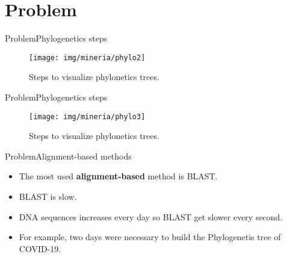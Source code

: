 \documentclass[10pt]{beamer}
\newcommand{\1}{
	\setbeamertemplate{background}{
		\texttt{[image: img/1\_dna]}
		\tikz[overlay] \fill[fill opacity=0.75,fill=white] (0,0) rectangle (-\paperwidth,\paperheight);
	}
}
\begin{document}
\section{Problem}

\begin{frame}{Problem}{Phylogenetics steps}
	\begin{figure}[]
		\centering
		\texttt{[image: img/mineria/phylo2]}
		\label{img:mot2}
		\caption{Steps to visualize phylonetics trees.}
	\end{figure}
\end{frame}

\begin{frame}{Problem}{Phylogenetics steps}
	\begin{figure}[]
		\centering
		\texttt{[image: img/mineria/phylo3]}
		\label{img:mot2}
		\caption{Steps to visualize phylonetics trees.}
	\end{figure}
\end{frame}


\begin{frame}{Problem}{Alignment-based methods}
	\begin{block}{}
		\begin{itemize}
			\item The most used \textbf{alignment-based} method is BLAST. \pause
			\item BLAST is slow. \pause
			\item DNA sequences increases every day so BLAST get slower every second. \pause		 	
			\item For example, two days were necessary to build the Phylogenetis tree of COVID-19. 
		\end{itemize}
	\end{block}
\end{frame}
\end{document}
